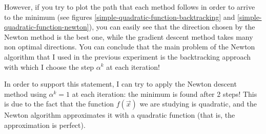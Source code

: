         However, if you try to plot the path that each method follows in order to arrive to the minimum (see figures \ref{simple-quadratic-function-backtracking} and \ref{simple-quadratic-function-newton}), you can easily see that the direction chosen by the Newton method is the best one, while the gradient descent method takes many non optimal directions. You can conclude that the main problem of the Newton algorithm that I used in the previous experiment is the backtracking approach with which I choose the step \(\alpha^k\) at each iteration!\par
        In order to support this statement, I can try to apply the Newton descent method using \(\alpha^k = 1\) at each iteration: the minimum is found after 2 steps! This is due to the fact that the function \(f(\vec{x})\) we are studying is quadratic, and the Newton algorithm approximates it with a quadratic function (that is, the approximation is perfect).